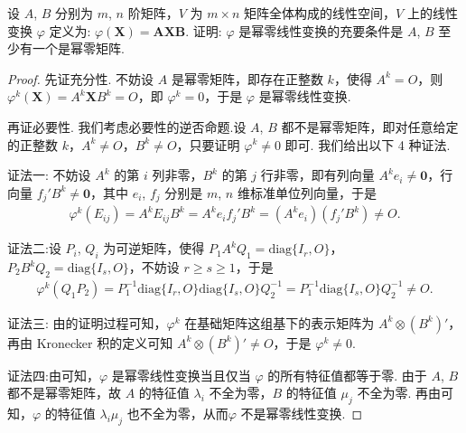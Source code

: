 \documentclass[../../main.tex]{subfiles}%
\begin{document}
\begin{example}
设 $A$, $B$ 分别为 $m$, $n$ 阶矩阵，$V$ 为 $m\times n$ 矩阵全体构成的线性空间，$V$ 上的线性变换 $\varphi$ 定义为: $\varphi(\boldsymbol{X}) = \boldsymbol{A}\boldsymbol{X}\boldsymbol{B}$. 证明: $\varphi$ 是幂零线性变换的充要条件是 $A$, $B$ 至少有一个是幂零矩阵.
\end{example}
\begin{proof}

先证充分性. 不妨设 $A$ 是幂零矩阵，即存在正整数 $k$，使得 $A^k = O$，则 $\varphi^k(\boldsymbol{X}) = A^k\boldsymbol{X}B^k = O$，即 $\varphi^k = 0$，于是 $\varphi$ 是幂零线性变换.

再证必要性. 我们考虑必要性的逆否命题.设 $A$, $B$ 都不是幂零矩阵，即对任意给定的正整数 $k$，$A^k\neq O$，$B^k\neq O$，只要证明 $\varphi^k\neq 0$ 即可. 我们给出以下 4 种证法.

{\color{blue}证法一:}
不妨设 $A^k$ 的第 $i$ 列非零，$B^k$ 的第 $j$ 行非零，即有列向量 $A^ke_i\neq \boldsymbol{0}$，行向量 $f_j'B^k\neq \boldsymbol{0}$，其中 $e_i$, $f_j$ 分别是 $m$, $n$ 维标准单位列向量，于是
\begin{align*}
\varphi^k(E_{ij}) = A^kE_{ij}B^k = A^ke_if_j'B^k = (A^ke_i)(f_j'B^k)\neq O.
\end{align*}

{\color{blue}证法二:}设 $P_i$, $Q_i$ 为可逆矩阵，使得 $P_1A^kQ_1 = \mathrm{diag}\{I_r, O\}$，$P_2B^kQ_2 = \mathrm{diag}\{I_s, O\}$，不妨设 $r\geqslant  s\geqslant  1$，于是
\begin{align*}
\varphi^k(Q_1P_2) = P_1^{-1}\mathrm{diag}\{I_r, O\}\mathrm{diag}\{I_s, O\}Q_2^{-1} = P_1^{-1}\mathrm{diag}\{I_s, O\}Q_2^{-1}\neq O.
\end{align*}

{\color{blue}证法三:} 由的证明过程可知，$\varphi^k$ 在基础矩阵这组基下的表示矩阵为 $A^k\otimes (B^k)'$，再由 Kronecker 积的定义可知 $A^k\otimes (B^k)'\neq O$，于是 $\varphi^k\neq 0$.

{\color{blue}证法四:}由可知，$\varphi$ 是幂零线性变换当且仅当 $\varphi$ 的所有特征值都等于零. 由于 $A$, $B$ 都不是幂零矩阵，故 $A$ 的特征值 $\lambda_i$ 不全为零，$B$ 的特征值 $\mu_j$ 不全为零. 再由可知，$\varphi$ 的特征值 $\lambda_i\mu_j$ 也不全为零，从而$\varphi$ 不是幂零线性变换.

\end{proof}
\end{document}
